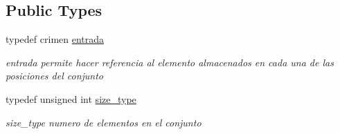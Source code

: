 \subsection*{Public Types}
\begin{DoxyCompactItemize}
\item 
\hypertarget{classconjunto_a09cad766dd65de73e51eae21f9d22585}{typedef crimen \hyperlink{classconjunto_a09cad766dd65de73e51eae21f9d22585}{entrada}}\label{classconjunto_a09cad766dd65de73e51eae21f9d22585}

\begin{DoxyCompactList}\small\item\em entrada permite hacer referencia al elemento almacenados en cada una de las posiciones del conjunto \end{DoxyCompactList}\item 
\hypertarget{classconjunto_a855a5893bb0f5a851ab2dbf2b8aa6cc7}{typedef unsigned int \hyperlink{classconjunto_a855a5893bb0f5a851ab2dbf2b8aa6cc7}{size\-\_\-type}}\label{classconjunto_a855a5893bb0f5a851ab2dbf2b8aa6cc7}

\begin{DoxyCompactList}\small\item\em size\-\_\-type numero de elementos en el conjunto \end{DoxyCompactList}\end{DoxyCompactItemize}
